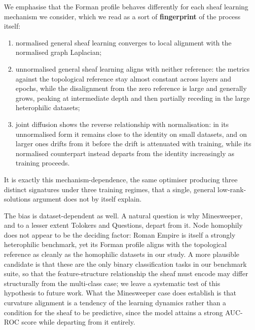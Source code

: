 We emphasise that the Forman profile behaves differently for each sheaf
learning mechanism we consider, which we read as a sort of
\textbf{fingerprint} of the process itself:
\begin{enumerate}
    \item normalised general sheaf learning converges to local alignment with
    the normalised graph Laplacian;
    \item unnormalised general sheaf learning aligns with neither reference:
    the metrics against the topological reference stay almost constant across
    layers and epochs, while the disalignment from the zero reference is large
    and generally grows, peaking at intermediate depth and then partially
    receding in the large heterophilic datasets;
    \item joint diffusion shows the reverse relationship with normalisation:
    in its unnormalised form it remains close to the identity on small
    datasets, and on larger ones drifts from it before the drift is
    attenuated with training, while its normalised counterpart instead departs
    from the identity increasingly as training proceeds.
\end{enumerate}
It is exactly this mechanism-dependence, the same optimiser producing three
distinct signatures under three training regimes, that a single, general
low-rank-solutions argument does not by itself explain.

The bias is dataset-dependent as well. A natural question is why Minesweeper,
and to a lesser extent Tolokers and Questions, depart from it. Node homophily
does not appear to be the deciding factor: Roman Empire is itself a strongly
heterophilic benchmark, yet its Forman
profile aligns with the topological reference as cleanly as the homophilic
datasets in our study. A more plausible candidate is that these are the only
binary classification tasks in our benchmark suite, so that the
feature-structure relationship the sheaf must encode may differ structurally
from the multi-class case; we leave a systematic test of this hypothesis to
future work. What the Minesweeper case does establish is that curvature
alignment is a tendency of the learning dynamics rather than a condition for
the sheaf to be predictive, since the model attains a strong AUC-ROC score
while departing from it entirely.

